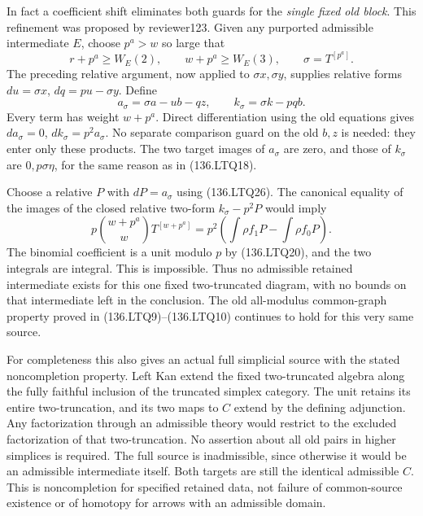 In fact a coefficient shift eliminates both guards for the
\emph{single fixed old block}.  This refinement was proposed by
reviewer123.  Given any purported admissible intermediate
\(E\), choose \(p^a>w\) so large that
\[
 r+p^a\geq W_E(2),\qquad w+p^a\geq W_E(3),
                 \qquad \sigma=T^{[p^a]}.
                                                        \tag{136.LTQ26}
\]
The preceding relative argument, now applied to
\(\sigma x,\sigma y\), supplies relative forms
\(du=\sigma x\), \(dq=pu-\sigma y\).  Define
\[
 a_\sigma=\sigma a-ub-qz,\qquad
 k_\sigma=\sigma k-pqb.
                                                        \tag{136.LTQ27}
\]
Every term has weight \(w+p^a\).  Direct differentiation
using the old equations gives
\(da_\sigma=0\), \(dk_\sigma=p^2a_\sigma\).
No separate comparison guard on the old \(b,z\) is
needed: they enter only these products.  The two target images
of \(a_\sigma\) are zero, and those of
\(k_\sigma\) are \(0,p\sigma\eta\), for the
same reason as in (136.LTQ18).

Choose a relative \(P\) with \(dP=a_\sigma\)
using (136.LTQ26).  The canonical equality of the images
of the closed relative two-form \(k_\sigma-p^2P\)
would imply
\[
 p\binom{w+p^a}{w}T^{[w+p^a]}
     =p^2\left(\int\rho f_1P-\int\rho f_0P\right).
                                                        \tag{136.LTQ28}
\]
The binomial coefficient is a unit modulo \(p\) by
(136.LTQ20), and the two integrals are integral.  This is
impossible.  Thus no admissible retained intermediate exists
for this one fixed two-truncated diagram, with no bounds on
that intermediate left in the conclusion.  The old all-modulus
common-graph property proved in (136.LTQ9)--(136.LTQ10)
continues to hold for this very same source.

For completeness this also gives an actual full simplicial
source with the stated noncompletion property.  Left Kan
extend the fixed two-truncated algebra along the fully faithful
inclusion of the truncated simplex category.  The unit retains
its entire two-truncation, and its two maps to \(C\)
extend by the defining adjunction.  Any factorization through
an admissible theory would restrict to the excluded factorization
of that two-truncation.  No assertion about all old pairs in
higher simplices is required.  The full source is inadmissible,
since otherwise it would be an admissible intermediate itself.
Both targets are still the identical admissible \(C\).
This is noncompletion for specified retained data, not failure
of common-source existence or of homotopy for arrows with an
admissible domain.

